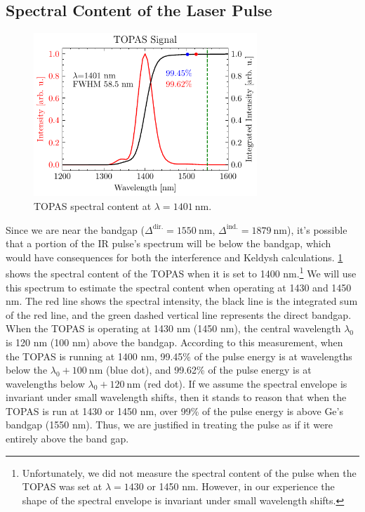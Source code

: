 \subsection{Spectral Content of the Laser Pulse}
\label{sec:bandwidth_of_pulse}

\begin{figure}
	\centering
	\includegraphics[width=0.75\textwidth]{figures/chap4/TOPAS_1400nm_spectral_inten.pdf}
	\caption{TOPAS spectral content at $\lambda = 1401 \ \textrm{nm}$.}
	\label{fig:TOPAS_1400nm_spectral_inten}
\end{figure}

Since we are near the bandgap ($\Delta^{\textrm{dir.}} = 1550 \ \textrm{nm}$, $\Delta^{\textrm{ind.}} = 1879 \ \textrm{nm}$), it's possible that a portion of the IR pulse's spectrum will be below the bandgap, which would have consequences for both the interference and Keldysh calculations. \cref{fig:TOPAS_1400nm_spectral_inten} shows the spectral content of the TOPAS when it is set to 1400 nm.\footnote{Unfortunately, we did not measure the spectral content of the pulse when the TOPAS was set at $\lambda = 1430$ or 1450 nm. However, in our experience the shape of the spectral envelope is invariant under small wavelength shifts.} We will use this spectrum to estimate the spectral content when operating at 1430 and 1450 nm. The red line shows the spectral intensity, the black line is the integrated sum of the red line, and the green dashed vertical line represents the direct bandgap. When the TOPAS is operating at 1430 nm (1450 nm), the central wavelength $\lambda_0$ is 120 nm (100 nm) above the bandgap. According to this measurement, when the TOPAS is running at 1400 nm, 99.45\% of the pulse energy is at wavelengths below the $\lambda_0 + 100 \ \textrm{nm}$ (blue dot), and 99.62\% of the pulse energy is at wavelengths below $\lambda_0 + 120 \ \textrm{nm}$ (red dot). If we assume the spectral envelope is invariant under small wavelength shifts, then it stands to reason that when the TOPAS is run at 1430 or 1450 nm, over 99\% of the pulse energy is above Ge's bandgap (1550 nm). Thus, we are justified in treating the pulse as if it were entirely above the band gap.

